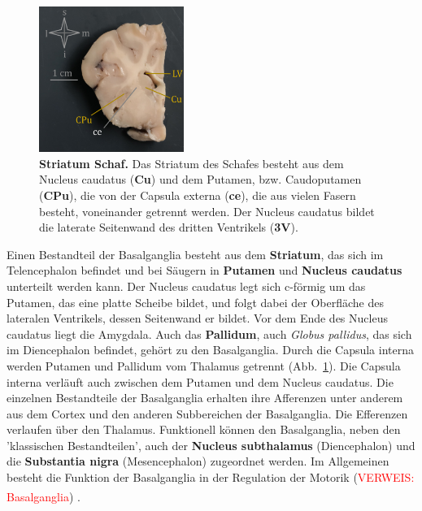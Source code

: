 \documentclass[12pt,a4paper,pdftex]{article}
\begin{document}
\begin{figure}
    \centering
    \includegraphics[width=0.42\textwidth]{pictures/Bilder_Jule/Schaf/Ausschnitte/Striatum.png}
    \caption[Striatum Schaf.]{\textbf{Striatum Schaf.} Das Striatum des Schafes besteht aus dem Nucleus caudatus (\textbf{Cu}) und dem Putamen, bzw. Caudoputamen (\textbf{CPu}), die von der Capsula externa (\textbf{ce}), die aus vielen Fasern besteht, voneinander getrennt werden. Der Nucleus caudatus bildet die laterate Seitenwand des dritten Ventrikels (\textbf{3V}).}
    \label{fig:striatum}
\end{figure}

\noindent Einen Bestandteil der Basalganglia besteht aus dem \textbf{Striatum}, das sich im Telencephalon befindet und bei Säugern in \textbf{Putamen} und \textbf{Nucleus caudatus}  unterteilt werden kann. Der Nucleus caudatus legt sich c-förmig um das Putamen, das eine platte Scheibe bildet, und folgt dabei der Oberfläche des lateralen Ventrikels, dessen Seitenwand er bildet. Vor dem Ende des Nucleus caudatus liegt die Amygdala. Auch das \textbf{Pallidum}, auch \textit{Globus pallidus}, das sich im Diencephalon befindet, gehört zu den Basalganglia. Durch die Capsula interna werden Putamen und Pallidum vom Thalamus getrennt (Abb.~\ref{fig:striatum}). Die Capsula interna verläuft auch zwischen dem Putamen und dem Nucleus caudatus. Die einzelnen Bestandteile der Basalganglia erhalten ihre Afferenzen unter anderem aus dem Cortex und den anderen Subbereichen der Basalganglia. Die Efferenzen verlaufen über den Thalamus. Funktionell können den Basalganglia, neben den 'klassischen Bestandteilen', auch der \textbf{Nucleus subthalamus} (Diencephalon) und die \textbf{Substantia nigra} (Mesencephalon) zugeordnet werden.
Im Allgemeinen besteht die Funktion der Basalganglia in der Regulation der Motorik (\textcolor{red}{VERWEIS: Basalganglia}) \textsuperscript{\cite[9]{trepel2011neuroanatomie}}.
\end{document}
